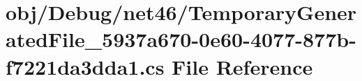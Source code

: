 \hypertarget{_debug_2net46_2_temporary_generated_file__5937a670-0e60-4077-877b-f7221da3dda1_8cs}{}\section{obj/\+Debug/net46/\+Temporary\+Generated\+File\+\_\+5937a670-\/0e60-\/4077-\/877b-\/f7221da3dda1.cs File Reference}
\label{_debug_2net46_2_temporary_generated_file__5937a670-0e60-4077-877b-f7221da3dda1_8cs}

